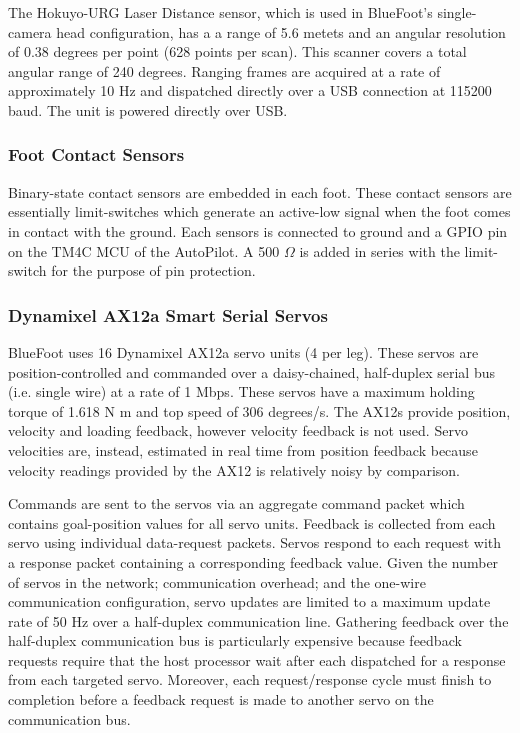 				The Hokuyo-URG Laser Distance sensor, which is used in BlueFoot's single-camera head configuration, has a a range of 5.6 metets and an angular resolution of 0.38 degrees per point (628 points per scan). This scanner covers a total angular range of 240 degrees. Ranging frames are acquired at a rate of approximately 10 Hz and dispatched directly over a USB connection at 115200 baud. The unit is powered directly over USB.

			\subsubsection{Foot Contact Sensors}

				Binary-state contact sensors are embedded in each foot. These contact sensors are essentially limit-switches which generate an active-low signal when the foot comes in contact with the ground. Each sensors is connected to ground and a GPIO pin on the TM4C MCU of the AutoPilot. A 500 $\Omega$ is added in series with the limit-switch for the purpose of pin protection.

			\subsubsection{Dynamixel AX12a Smart Serial Servos}

				BlueFoot uses 16 Dynamixel AX12a servo units (4 per leg). These servos are position-controlled and commanded over a daisy-chained, half-duplex serial bus (i.e. single wire) at a rate of 1 Mbps. These servos have a maximum holding torque of 1.618 N m and top speed of 306 degrees/s. The AX12s provide position, velocity and loading feedback, however velocity feedback is not used. Servo velocities are, instead, estimated in real time from position feedback because velocity readings provided by the AX12 is relatively noisy by comparison. 

				Commands are sent to the servos via an aggregate command packet which contains goal-position values for all servo units. Feedback is collected from each servo using individual data-request packets. Servos respond to each request with a response packet containing a corresponding feedback value. Given the number of servos in the network; communication overhead; and the one-wire communication configuration, servo updates are limited to a maximum update rate of 50 Hz over a half-duplex communication line. Gathering feedback over the half-duplex communication bus is particularly expensive because feedback requests require that the host processor wait after each dispatched for a response from each targeted servo. Moreover, each request/response cycle must finish to completion before a feedback request is made to another servo on the communication bus.

